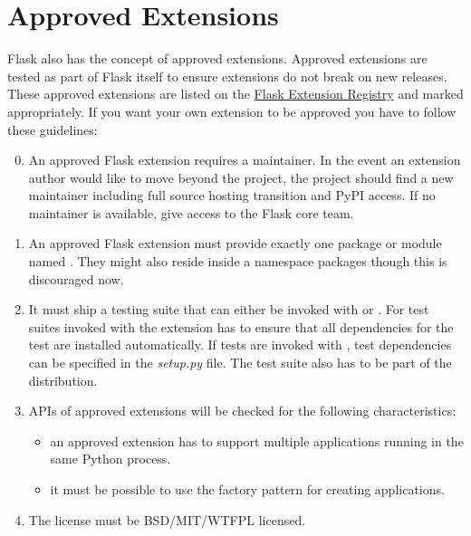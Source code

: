 \documentclass[a4paper,12pt]{sphinxmanual}
\begin{document}
\section{Approved Extensions}
\label{extensiondev:approved-extensions}
Flask also has the concept of approved extensions.  Approved extensions
are tested as part of Flask itself to ensure extensions do not break on
new releases.  These approved extensions are listed on the \href{http://flask.pocoo.org/extensions/}{Flask
Extension Registry} and marked appropriately.  If you want your own
extension to be approved you have to follow these guidelines:
\begin{enumerate}
\setcounter{enumi}{-1}
\item {} 
An approved Flask extension requires a maintainer. In the event an
extension author would like to move beyond the project, the project should
find a new maintainer including full source hosting transition and PyPI
access.  If no maintainer is available, give access to the Flask core team.

\item {} 
An approved Flask extension must provide exactly one package or module
named .  They might also reside inside a
 namespace packages though this is discouraged now.

\item {} 
It must ship a testing suite that can either be invoked with 
or .  For test suites invoked with  the extension has to ensure that all dependencies for the test
are installed automatically.  If tests are invoked with , test dependencies can be specified in the \emph{setup.py} file.  The
test suite also has to be part of the distribution.

\item {} 
APIs of approved extensions will be checked for the following
characteristics:
\begin{itemize}
\item {} 
an approved extension has to support multiple applications
running in the same Python process.

\item {} 
it must be possible to use the factory pattern for creating
applications.

\end{itemize}

\item {} 
The license must be BSD/MIT/WTFPL licensed.


\end{enumerate}
\end{document}
